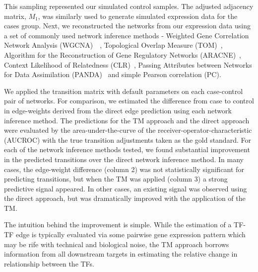 \documentclass[english]{article}
\begin{document}
This sampling represented our simulated control samples. The adjusted
adjacency matrix, $M_{1}$, was similarly used to generate simulated
expression data for the cases group. Next, we reconstructed the networks
from our expression data using a set of commonly used network inference
methods - Weighted Gene Correlation Network Analysis (WGCNA)~\cite{Langfelder2008WGCNA}~\cite{Langfelder2008FastR},
Topological Overlap Measure (TOM)~\cite{ravasz2002hierarchical},
Algorithm for the Reconstruction of Gene Regulatory Networks (ARACNE)~\cite{margolin2006aracne},
Context Likelihood of Relatedness (CLR)~\cite{faith2007large}, Passing
Attributes between Networks for Data Assimilation (PANDA)~\cite{glass2013passing}
and simple Pearson correlation (PC). 

We applied the transition matrix with default parameters on each case-control
pair of networks. For comparison, we estimated the difference from
case to control in edge-weights derived from the direct edge prediction
using each network inference method. The predictions for the TM approach
and the direct approach were evaluated by the area-under-the-curve
of the receiver-operator-characteristic (AUCROC) with the true transition
adjustments taken as the gold standard. For each of the network inference
methods tested, we found substantial improvement in the predicted
transitions over the direct network inference method. In many cases,
the edge-weight difference (column 2) was not statistically significant
for predicting transitions, but when the TM was applied (column 3)
a strong predictive signal appeared. In other cases, an existing signal
was observed using the direct approach, but was dramatically improved
with the application of the TM.

The intuition behind the improvement is simple. While the estimation
of a TF-TF edge is typically evaluated via some pairwise gene expression
pattern which may be rife with technical and biological noise, the
TM approach borrows information from all downstream targets in estimating
the relative change in relationship between the TFs. 
\end{document}
